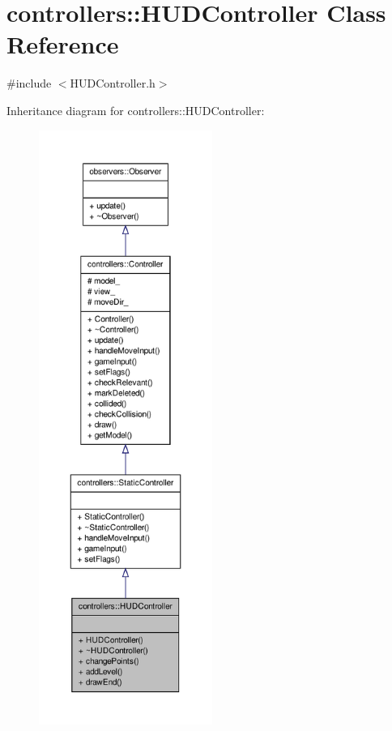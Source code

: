 \hypertarget{classcontrollers_1_1HUDController}{\section{controllers\-:\-:\-H\-U\-D\-Controller \-Class \-Reference}
\label{dc/dc4/classcontrollers_1_1HUDController}
}


{\ttfamily \#include $<$\-H\-U\-D\-Controller.\-h$>$}



\-Inheritance diagram for controllers\-:\-:\-H\-U\-D\-Controller\-:\nopagebreak
\begin{figure}[H]
\begin{center}
\leavevmode
\includegraphics[height=550pt]{dc/dbd/classcontrollers_1_1HUDController__inherit__graph}
\end{center}
\end{figure}


